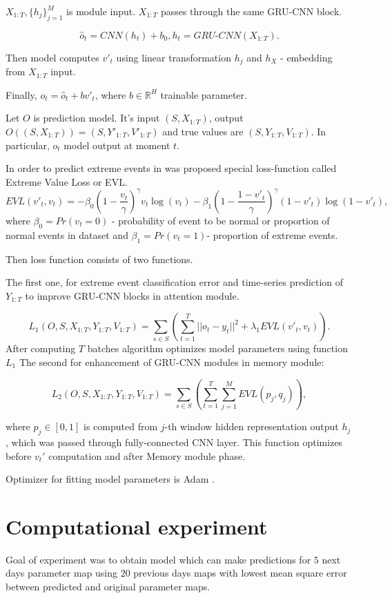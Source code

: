\documentclass{article}
\begin{document}
$X_{1:T}, \{h_j\}_{j=1}^M$ is module input. $X_{1:T}$ passes through the same GRU-CNN block. 

$$\hat{o}_t = \textit{CNN}(h_t) + b_0, h_t = \textit{GRU-CNN}(X_{1:T}).$$

Then model computes $v'_t$ using linear transformation $h_j$ and $h_X$ - embedding from $X_{1:T}$ input.

Finally, $o_t = \hat{o}_t + bv'_t$, where $b \in \mathbb{R}^H$  trainable parameter.

Let $O$ is prediction model. It's input $(S,X_{1:T})$, output $O((S, X_{1:T})) = (S,Y'_{1:T}, V'_{1:T})$ and true values are $(S, Y_{1:T}, V_{1:T})$. In particular, $o_t$  model output at moment $t$. 

In order to predict extreme events in \cite{EVL:1} was proposed special loss-function called Extreme Value Loss or EVL. 
$$\textit{EVL}(v'_t,v_t) = -\beta_0 \left( 1 - \frac{v_t}{\gamma}\right)^\gamma v_t\log(v_t) -\beta_1 \left( 1 - \frac{1 - v'_t}{\gamma}\right)^\gamma (1-v'_t)\log(1 - v'_t), $$ 
where $\beta_0 = Pr(v_t = 0 )$ - probability of event to be normal or proportion of normal events in dataset and $\beta_1 = Pr(v_t= 1)$- proportion of extreme events.

Then loss function  consists of two functions. 

The first one, for extreme event classification error and time-series prediction of $Y_{1:T}$ to improve GRU-CNN blocks in attention module.

$$L_1(O, S, X_{1:T}, Y_{1:T},V_{1:T} ) = \sum \limits_{s\in S}\left( \sum\limits_{t=1}^T ||o_t - y_t||^2 +  \lambda_1 \textit{EVL}(v'_t, v_t
)\right).$$
After computing $T$ batches algorithm optimizes  model parameters using function $L_1$ 
The second for enhancement of GRU-CNN modules in  memory module:

$$L_2(O, S, X_{1:T}, Y_{1:T},V_{1:T} ) = \sum \limits_{s\in S}\left( \sum\limits_{t=1}^T \sum \limits_{j=1}^M \textit{EVL}(p_j,q_j)\right),$$

where $p_j \in [0,1]$ is computed from $j$-th window hidden representation output $h_j$ , which was passed through fully-connected CNN layer. This function optimizes before $v_t'$ computation and after Memory module phase.

Optimizer for fitting model parameters is Adam \cite{ADAM:5}. 
\section{Computational experiment}
Goal of experiment was to obtain model which can make predictions for $5$ next days parameter map using $20$ previous days maps with lowest mean square error between predicted and original parameter maps. 
\end{document}
